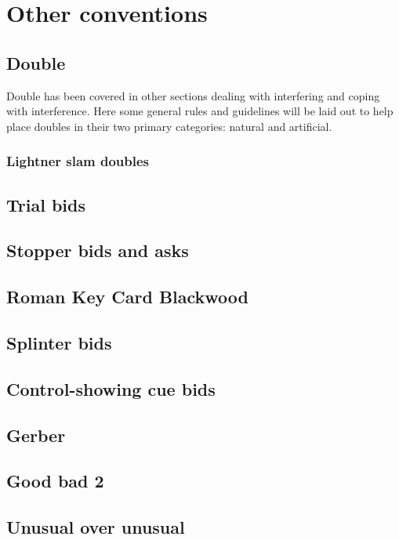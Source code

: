 \chapter{Other conventions}
\label{ch:other_conventions}

\section{Double}

Double has been covered in other sections dealing with interfering and coping with interference.
Here some general rules and guidelines will be laid out to help place doubles in their two primary
categories: natural and artificial.

\subsection{Lightner slam doubles}

\section{Trial bids}

\section{Stopper bids and asks}

\section{Roman Key Card Blackwood}

\section{Splinter bids}

\section{Control-showing cue bids}

\section{Gerber}

\section{Good bad 2\bN}

\section{Unusual over unusual}

